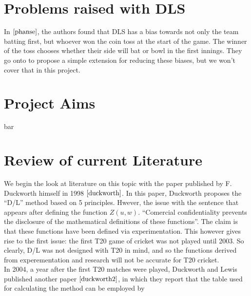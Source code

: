 \section{Problems raised with DLS}
In $\cite{phanse}$, the authors found that DLS has a bias towards not only the team batting first, but whoever won the coin toss at the start of the game.
The winner of the toss chooses whether their side will bat or bowl in the first innings. They go onto to propose a simple extension for reducing
these biases, but we won't cover that in this project. 

\section{Project Aims}
bar

\section{Review of current Literature}
We begin the look at literature on this topic with the paper published by F. Duckworth himself in 1998 $\cite{duckworth}$. In this paper, 
Duckworth proposes the ``D/L'' method based on 5 principles. Hwever, the issue with the sentence that appears after defining the function $Z(u,w)$.
``Comercial confidentiality prevents the disclosure of the mathematical definitions of these functions''. The claim is that these functions have been 
defined via experimentation. This however gives rise to the first issue: the first T20 game of cricket was not played until 2003. So clearly, D/L was not
designed with T20 in mind, and so the functions derived from experementation and research will not be accurate for T20 cricket. \\

In 2004, a year after the first T20 matches were played, Duckworth and Lewis published another paper $\cite{duckworth2}$, in which they report
that the table used for calculating the method can be employed by 
